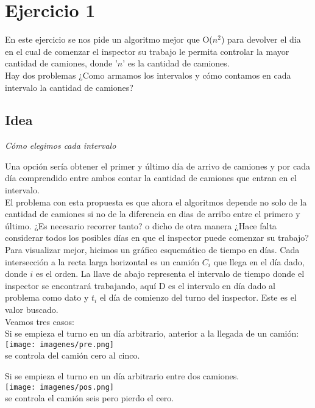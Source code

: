 \documentclass[11pt,a4paper]{article}
\begin{document}
\section{Ejercicio 1}

En este ejercicio se nos pide un algoritmo mejor que O($n^2$) para devolver el dia en el cual de comenzar el inspector su trabajo le permita controlar la mayor cantidad de camiones, donde '$n$' es la cantidad de camiones.\\
Hay dos problemas ¿Como armamos los intervalos y cómo contamos en cada intervalo la cantidad de camiones?

\subsection{Idea}

\emph{Cómo elegimos cada intervalo}

Una opción sería obtener el primer y último día de arrivo de camiones y por cada día comprendido entre ambos contar la cantidad de camiones que entran en el intervalo.\\
El problema con esta propuesta es que ahora el algoritmos depende no solo de la cantidad de camiones si no de la diferencia en dias de arribo entre el primero y último.
¿Es necesario recorrer tanto? o dicho de otra manera ¿Hace falta considerar todos los posibles días en que el inspector puede comenzar su trabajo?\\

Para visualizar mejor, hicimos un gráfico esquemático de tiempo en días. Cada intersección a la recta larga horizontal es un camión $C_i$ que llega en el día dado, donde $i$ es el orden. La llave de abajo representa el intervalo de tiempo donde el inspector se encontrará trabajando, aquí D es el intervalo en día dado al problema como dato y $t_i$ el día de comienzo del turno del inspector. Este es el valor buscado.\\ Veamos tres casos:\\


Si se empieza el turno en un día arbitrario, anterior a la llegada de un camión:\\
\texttt{[image: imagenes/pre.png]}\\
se controla del camión cero al cinco.

Si se empieza el turno en un día arbitrario entre dos camiones.\\
\texttt{[image: imagenes/pos.png]}\\
se controla el camión seis pero pierdo el cero.
\end{document}
